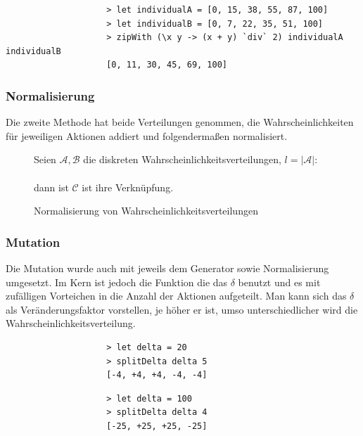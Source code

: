             \begin{verbatim}
                    > let individualA = [0, 15, 38, 55, 87, 100]
                    > let individualB = [0, 7, 22, 35, 51, 100]
                    > zipWith (\x y -> (x + y) `div` 2) individualA individualB
                    [0, 11, 30, 45, 69, 100]
            \end{verbatim}

            \subsubsection*{Normalisierung}
            Die zweite Methode hat beide Verteilungen genommen, die Wahrscheinlichkeiten für jeweiligen Aktionen addiert und folgendermaßen normalisiert.\\
            \noindent
            \begin{figure}[H]
                \begin{mdframed}
                    Seien $\mathcal{A, B}$ die diskreten Wahrscheinlichkeitsverteilungen, $l = |\mathcal{A}|$:\\[4mm]
                    \hspace*{40mm} \\[4mm]
                    dann ist $\mathcal{C}$ ist ihre Verknüpfung.
                \end{mdframed}
                \caption{\label{norm-prop} Normalisierung von Wahrscheinlichkeitsverteilungen}
            \end{figure}

            \subsubsection*{Mutation}
            Die Mutation wurde auch mit jeweils dem Generator sowie Normalisierung umgesetzt. Im Kern ist jedoch die Funktion die das $\delta$ benutzt und es mit zufälligen Vorteichen in die Anzahl der Aktionen aufgeteilt. Man kann sich das $\delta$ als Veränderungsfaktor vorstellen, je höher er ist, umso unterschiedlicher wird die Wahrscheinlichkeitsverteilung.
            \begin{multicols}{2}
                \begin{verbatim}
                    > let delta = 20
                    > splitDelta delta 5
                    [-4, +4, +4, -4, -4]
                \end{verbatim}
                \begin{verbatim}
                    > let delta = 100
                    > splitDelta delta 4
                    [-25, +25, +25, -25]
                \end{verbatim}
            \end{multicols}

